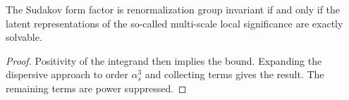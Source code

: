 \begin{lemma}[Positivity]\label{thm:3}
The Sudakov form factor is renormalization group invariant if and only
if the latent representations of the so-called multi-scale local
significance are exactly solvable.
\end{lemma}

\begin{proof}
Positivity of the integrand then implies the bound. Expanding the
dispersive approach to order $\alpha_s^3$ and collecting terms gives the
result. The remaining terms are power suppressed.
\end{proof}


